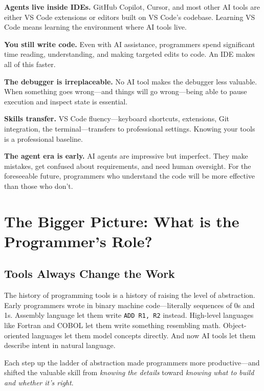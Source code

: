\documentclass[11pt,letterpaper]{article}
\begin{document}
\begin{conceptbox}
\textbf{Agents live inside IDEs.} GitHub Copilot, Cursor, and most other AI tools are either VS Code extensions or editors built on VS Code's codebase. Learning VS Code means learning the environment where AI tools live.

\textbf{You still write code.} Even with AI assistance, programmers spend significant time reading, understanding, and making targeted edits to code. An IDE makes all of this faster.

\textbf{The debugger is irreplaceable.} No AI tool makes the debugger less valuable. When something goes wrong---and things will go wrong---being able to pause execution and inspect state is essential.

\textbf{Skills transfer.} VS Code fluency---keyboard shortcuts, extensions, Git integration, the terminal---transfers to professional settings. Knowing your tools is a professional baseline.

\textbf{The agent era is early.} AI agents are impressive but imperfect. They make mistakes, get confused about requirements, and need human oversight. For the foreseeable future, programmers who understand the code will be more effective than those who don't.
\end{conceptbox}

\section{The Bigger Picture: What is the Programmer's Role?}

\subsection{Tools Always Change the Work}

The history of programming tools is a history of raising the level of abstraction. Early programmers wrote in binary machine code---literally sequences of 0s and 1s. Assembly language let them write \texttt{ADD R1, R2} instead. High-level languages like Fortran and COBOL let them write something resembling math. Object-oriented languages let them model concepts directly. And now AI tools let them describe intent in natural language.

Each step up the ladder of abstraction made programmers more productive---and shifted the valuable skill from \textit{knowing the details} toward \textit{knowing what to build and whether it's right}.
\end{document}
